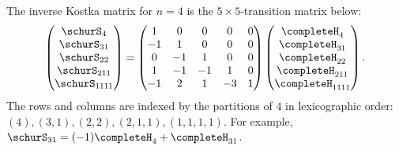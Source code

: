 \begin{example*}[The inverse Kostka matrix for $n=4$]

The inverse Kostka matrix for $n=4$ is the $5\times 5$-transition matrix below:
\[
\begin{pmatrix}
\schurS_{4} \\
\schurS_{31} \\
\schurS_{22} \\
\schurS_{211} \\
\schurS_{1111} \\
\end{pmatrix}
=
\begin{pmatrix}
 1 & 0 & 0 & 0 & 0 \\
 -1 & 1 & 0 & 0 & 0 \\
 0 & -1 & 1 & 0 & 0 \\
 1 & -1 & -1 & 1 & 0 \\
 -1 & 2 & 1 & -3 & 1 \\
\end{pmatrix}
\begin{pmatrix}
\completeH_{4} \\
\completeH_{31} \\
\completeH_{22} \\
\completeH_{211} \\
\completeH_{1111} \\
\end{pmatrix}.
\]
The rows and columns are indexed by the partitions of $4$ in lexicographic order:
$(4), (3,1), (2,2), (2,1,1), (1,1,1,1)$.
For example,
$\schurS_{31} = (-1)\completeH_{4} + \completeH_{31}$.

\begin{figure}
\end{figure}



\end{example*}

